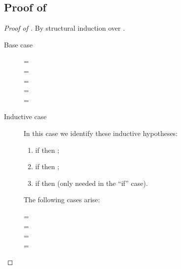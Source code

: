 \documentclass{article}
\theoremstyle{definition}
\begin{document}
\subsection{Proof of }\label{sec:proof-thm:backtr-corr}
\begin{proof}[Proof of ]
	By structural induction over .
	\begin{description}
		\item[Base case]
		\begin{description}
			\item[=]  
			\item[=\trg{\truev}]  
			\item[=\trg{\falsev}]  
			\item[=\trg{\fail}] 
			\item[=] 
		\end{description}
		\item[Inductive case]

		In this case we identify these inductive hypotheses:
		\begin{enumerate}
			\item if  then ;
			\item if  then ;
			\item if  then  (only needed in the ``if'' case).
		\end{enumerate}

		The following cases arise:
		\begin{description}
			\item[=] 
			\item[=]
			\item[=] 
			\item[=] 
		\end{description}
	\end{description}
\end{proof}
\end{document}
